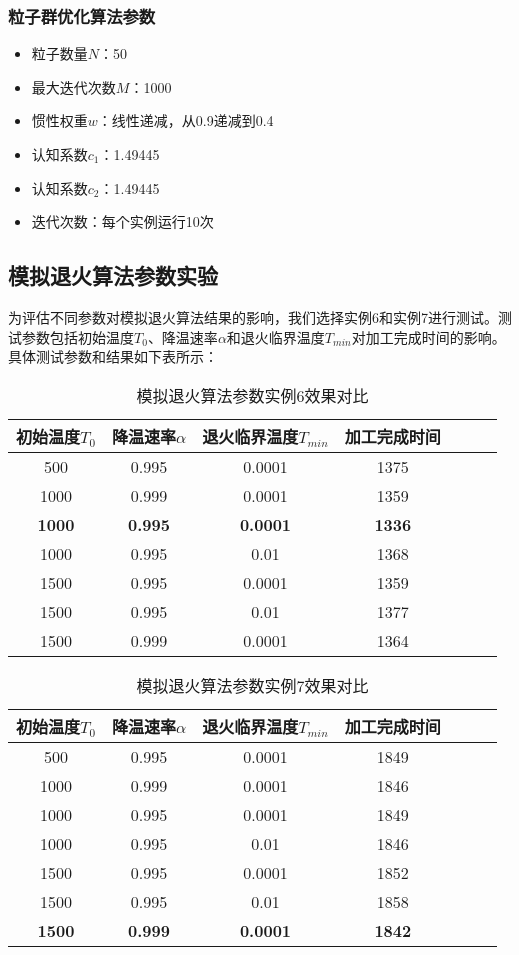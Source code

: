 \documentclass[12pt]{article}
\begin{document}
	\subsubsection{粒子群优化算法参数}
	\begin{itemize}
		\item 粒子数量$N$：50
		\item 最大迭代次数$M$：1000
		\item 惯性权重$w$：线性递减，从0.9递减到0.4
		\item 认知系数$c_1$：1.49445
		\item 认知系数$c_2$：1.49445
		\item 迭代次数：每个实例运行10次
	\end{itemize}

	\subsection{模拟退火算法参数实验}
	为评估不同参数对模拟退火算法结果的影响，我们选择实例6和实例7进行测试。测试参数包括初始温度$T_0$、降温速率$\alpha$和退火临界温度$T_{min}$对加工完成时间的影响。具体测试参数和结果如下表所示：
	
	\begin{table}[H]
		\centering
		\caption{模拟退火算法参数实例6效果对比}
		\begin{tabular}{ccccccc}
			\toprule %
			初始温度$T_0$ & 降温速率$\alpha$ & 退火临界温度$T_{min}$ &加工完成时间 \\ %
			\midrule %
			500&0.995&0.0001&1375\\
			1000&0.999&0.0001&1359\\
			\textbf{1000}&\textbf{0.995}&\textbf{0.0001}&\textbf{1336}\\
			1000&0.995&0.01&1368\\
			1500&0.995&0.0001&1359\\
			1500&0.995&0.01&1377 \\
			1500&0.999&0.0001&1364\\
			\bottomrule %
		\end{tabular}
		
	\end{table}
	
	\begin{table}[H]
		\centering
		\caption{模拟退火算法参数实例7效果对比}
		\begin{tabular}{ccccccc}
			\toprule %
			初始温度$T_0$ & 降温速率$\alpha$ & 退火临界温度$T_{min}$ &加工完成时间 \\ %
			\midrule %
			500&0.995&0.0001&1849\\
			1000&0.999&0.0001&1846\\
			1000&0.995&0.0001&1849\\
			1000&0.995&0.01&1846\\
			1500&0.995&0.0001&1852\\
			1500&0.995&0.01&1858 \\
			\textbf{1500}&\textbf{0.999}&\textbf{0.0001}&\textbf{1842}\\
			\bottomrule %
		\end{tabular}
	\end{table}
	
\end{document}
